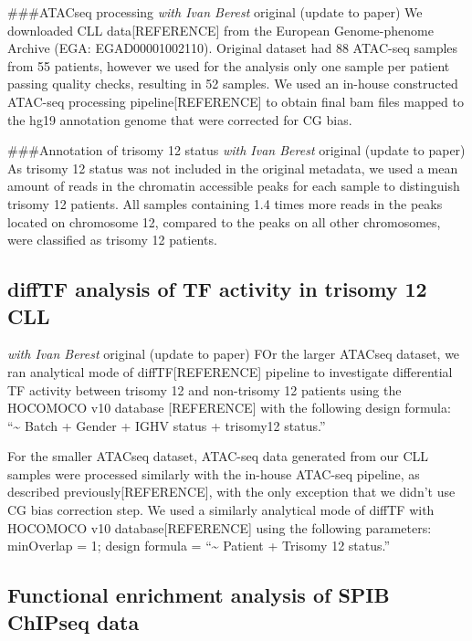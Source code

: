 \documentclass[11pt, a4paper, twosided]{book}
\begin{document}
\#\#\#ATACseq processing
\emph{with Ivan Berest} original (update to paper)
We downloaded CLL data{[}REFERENCE{]} from the European Genome-phenome Archive (EGA: EGAD00001002110). Original dataset had 88 ATAC-seq samples from 55 patients, however we used for the analysis only one sample per patient passing quality checks, resulting in 52 samples. We used an in-house constructed ATAC-seq processing pipeline{[}REFERENCE{]} to obtain final bam files mapped to the hg19 annotation genome that were corrected for CG bias.

\#\#\#Annotation of trisomy 12 status
\emph{with Ivan Berest} original (update to paper)
As trisomy 12 status was not included in the original metadata, we used a mean amount of reads in the chromatin accessible peaks for each sample to distinguish trisomy 12 patients. All samples containing 1.4 times more reads in the peaks located on chromosome 12, compared to the peaks on all other chromosomes, were classified as trisomy 12 patients.

\hypertarget{difftf-analysis-of-tf-activity-in-trisomy-12-cll}{%
\subsection{diffTF analysis of TF activity in trisomy 12 CLL}\label{difftf-analysis-of-tf-activity-in-trisomy-12-cll}}

\emph{with Ivan Berest} original (update to paper)
FOr the larger ATACseq dataset, we ran analytical mode of diffTF{[}REFERENCE{]} pipeline to investigate differential TF activity between trisomy 12 and non-trisomy 12 patients using the HOCOMOCO v10 database {[}REFERENCE{]} with the following design formula: ``\textasciitilde{} Batch + Gender + IGHV status + trisomy12 status.''

For the smaller ATACseq dataset, ATAC-seq data generated from our CLL samples were processed similarly with the in-house ATAC-seq pipeline, as described previously{[}REFERENCE{]}, with the only exception that we didn't use CG bias correction step. We used a similarly analytical mode of diffTF with HOCOMOCO v10 database{[}REFERENCE{]} using the following parameters: minOverlap = 1; design formula = ``\textasciitilde{} Patient + Trisomy 12 status.''

\hypertarget{functional-enrichment-analysis-of-spib-chipseq-data}{%
\subsection{Functional enrichment analysis of SPIB ChIPseq data}\label{functional-enrichment-analysis-of-spib-chipseq-data}}
\end{document}
